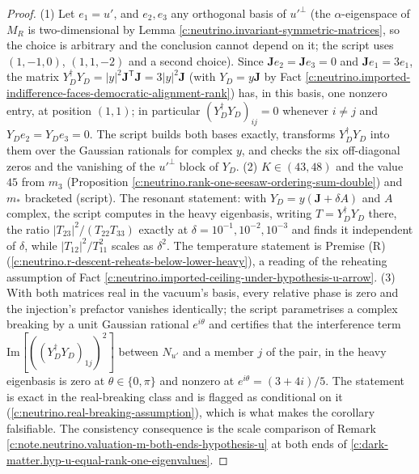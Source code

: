 \documentclass[11pt]{article}
\theoremstyle{definition}
\theoremstyle{plain}
\providecommand{\J}{}\renewcommand{\J}{\mathbf{J}}
\begin{document}
\begin{proof}
(1) Let $e_{1} = u'$, and $e_{2}, e_{3}$ any orthogonal basis of $u'^{\perp}$ (the $\alpha$-eigenspace of $M_{R}$ is two-dimensional by Lemma \ref{c:neutrino.invariant-symmetric-matrices}, so the choice is arbitrary and the conclusion cannot depend on it; the script uses $(1, -1, 0)$, $(1, 1, -2)$ and a second choice). Since $\J e_{2} = \J e_{3} = 0$ and $\J e_{1} = 3e_{1}$, the matrix $Y_{D}^{\dagger}Y_{D} = |y|^{2}\J^{\mathsf{T}}\J = 3|y|^{2}\J$ (with $Y_{D} = y\J$ by Fact \ref{c:neutrino.imported-indifference-faces-democratic-alignment-rank}) has, in this basis, one nonzero entry, at position $(1,1)$; in particular $(Y_{D}^{\dagger}Y_{D})_{ij} = 0$ whenever $i \neq j$ and $Y_{D}e_{2} = Y_{D}e_{3} = 0$. The script builds both bases exactly, transforms $Y_{D}^{\dagger}Y_{D}$ into them over the Gaussian rationals for complex $y$, and checks the six off-diagonal zeros and the vanishing of the $u'^{\perp}$ block of $Y_{D}$. (2) $K \in (43, 48)$ and the value $45$ from $m_{3}$ (Proposition \ref{c:neutrino.rank-one-seesaw-ordering-sum-double}) and $m_{*}$ bracketed (script). The resonant statement: with $Y_{D} = y(\J + \delta A)$ and $A$ complex, the script computes in the heavy eigenbasis, writing $T = Y_{D}^{\dagger}Y_{D}$ there, the ratio $|T_{23}|^{2}/(T_{22}T_{33})$ exactly at $\delta = 10^{-1}, 10^{-2}, 10^{-3}$ and finds it independent of $\delta$, while $|T_{12}|^{2}/T_{11}^{2}$ scales as $\delta^{2}$. The temperature statement is Premise (R) (\ref{c:neutrino.r-descent-reheats-below-lower-heavy}), a reading of the reheating assumption of Fact \ref{c:neutrino.imported-ceiling-under-hypothesis-u-arrow}. (3) With both matrices real in the vacuum's basis, every relative phase is zero and the injection's prefactor vanishes identically; the script parametrises a complex breaking by a unit Gaussian rational $e^{i\theta}$ and certifies that the interference term $\mathrm{Im}[((Y_{D}^{\dagger}Y_{D})_{1j})^{2}]$ between $N_{u'}$ and a member $j$ of the pair, in the heavy eigenbasis is zero at $\theta \in \{0, \pi\}$ and nonzero at $e^{i\theta} = (3 + 4i)/5$. The statement is exact in the real-breaking class and is flagged as conditional on it (\ref{c:neutrino.real-breaking-assumption}), which is what makes the corollary falsifiable. The consistency consequence is the scale comparison of Remark \ref{c:note.neutrino.valuation-m-both-ends-hypothesis-u} at both ends of \ref{c:dark-matter.hyp-u-equal-rank-one-eigenvalues}.

\end{proof}
\end{document}
